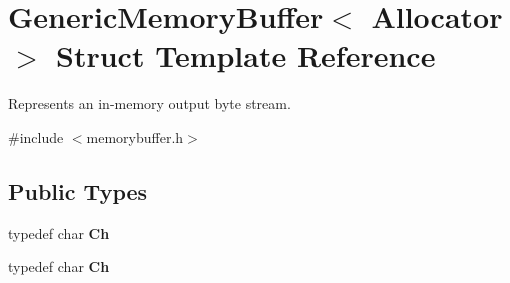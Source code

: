 \hypertarget{struct_generic_memory_buffer}{}\section{Generic\+Memory\+Buffer$<$ Allocator $>$ Struct Template Reference}
\label{struct_generic_memory_buffer}


Represents an in-\/memory output byte stream.  




{\ttfamily \#include $<$memorybuffer.\+h$>$}

\subsection*{Public Types}
\begin{DoxyCompactItemize}
\item 
typedef char {\bfseries Ch}\hypertarget{struct_generic_memory_buffer_a212f137abfd8bce2ad216b2d960c027f}{}\label{struct_generic_memory_buffer_a212f137abfd8bce2ad216b2d960c027f}

\item 
typedef char {\bfseries Ch}\hypertarget{struct_generic_memory_buffer_a212f137abfd8bce2ad216b2d960c027f}{}\label{struct_generic_memory_buffer_a212f137abfd8bce2ad216b2d960c027f}

\end{DoxyCompactItemize}
